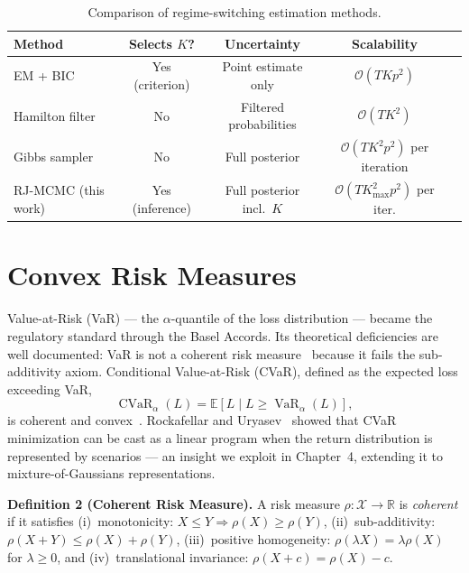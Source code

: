 \documentclass[12pt,oneside]{book}
\begin{document}
\begin{table}[H]
\centering
\caption{Comparison of regime-switching estimation methods.}
\label{tab:methods}
\begin{tabularx}{0.92\textwidth}{@{}l c c c X@{}}
\toprule
\textbf{Method} & \textbf{Selects $K$?} & \textbf{Uncertainty} & \textbf{Scalability} \\
\midrule
EM + BIC           & Yes (criterion) & Point estimate only         & $\mathcal{O}(T K p^2)$                  \\{}
Hamilton filter     & No              & Filtered probabilities      & $\mathcal{O}(T K^2)$                    \\{}
Gibbs sampler       & No              & Full posterior              & $\mathcal{O}(T K^2 p^2)$ per iteration  \\{}
RJ-MCMC (this work) & Yes (inference) & Full posterior incl.\ $K$   & $\mathcal{O}(T K_{\max}^2 p^2)$ per iter. \\
\bottomrule
\end{tabularx}
\end{table}

\section{Convex Risk Measures}

Value-at-Risk (VaR) --- the $\alpha$-quantile of the loss distribution --- became the regulatory standard through the Basel Accords. Its theoretical deficiencies are well documented: VaR is not a coherent risk measure~\cite{artzner1999} because it fails the sub-additivity axiom. Conditional Value-at-Risk (CVaR), defined as the expected loss exceeding VaR,
\begin{equation}
\operatorname{CVaR}_\alpha(L) = \mathbb{E}\!\left[L \mid L \geq \operatorname{VaR}_\alpha(L)\right],
\label{eq:cvar}
\end{equation}
is coherent and convex~\cite{rockafellar2000}. Rockafellar and Uryasev~\cite{rockafellar2002} showed that CVaR minimization can be cast as a linear program when the return distribution is represented by scenarios --- an insight we exploit in Chapter~4, extending it to mixture-of-Gaussians representations.

\begin{definitionbox}
\textbf{Definition 2 (Coherent Risk Measure).} A risk measure $\rho: \mathcal{X} \to \mathbb{R}$ is \textit{coherent} if it satisfies (i)~monotonicity: $X \leq Y \Rightarrow \rho(X) \geq \rho(Y)$, (ii)~sub-additivity: $\rho(X+Y) \leq \rho(X) + \rho(Y)$, (iii)~positive homogeneity: $\rho(\lambda X) = \lambda\rho(X)$ for $\lambda \geq 0$, and (iv)~translational invariance: $\rho(X + c) = \rho(X) - c$.
\end{definitionbox}
\end{document}
